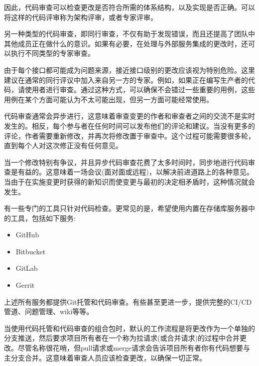 因此，代码审查可以检查更改是否符合所需的体系结构，以及实现是否正确。可以将这样的代码评审称为架构评审，或者专家评审。

另一种类型的代码审查，即同行审查，不仅有助于发现错误，而且还提高了团队中其他成员正在做什么的意识。如果有必要，在处理与外部服务集成的更改时，还可以执行不同类型的专家审查。

由于每个接口都可能成为问题来源，接近接口级别的更改应该视为特别危险。这里建议在通常的同行评议中加入来自另一方的专家。例如，如果正在编写生产者的代码，请使用者进行审查。通过这种方式，可以确保不会错过一些重要的用例，这些用例在某个方面可能认为不太可能出现，但另一方面可能经常使用。


代码审查通常会异步进行，这意味着审查变更的作者和审查者之间的交流不是实时发生的。相反，每个参与者在任何时间可以发布他们的评论和建议。当没有更多的评论，作者需要重新修改，并再次将修改置于审查中。这个过程可能需要很多轮，直到每个人对这次修正没有任何意见。

当一个修改特别有争议，并且异步代码审查花费了太多时间时，同步地进行代码审查是有益的。这意味着一场会议(面对面或远程)，以解决前进道路上的各种意见。当由于在实施变更时获得的新知识而使变更与最初的决定相矛盾时，这种情况就会发生。

有一些专门的工具只针对代码检查。更常见的是，希望使用内置在存储库服务器中的工具，包括如下服务:

\begin{itemize}
\item 
GitHub

\item 
Bitbucket

\item 
GitLab

\item 
Gerrit
\end{itemize}

上述所有服务都提供Git托管和代码审查。有些甚至更进一步，提供完整的CI/CD管道、问题管理、wiki等等。

当使用代码托管和代码审查的组合包时，默认的工作流程是将更改作为一个单独的分支推送，然后要求项目所有者在一个称为拉请求(或合并请求)的过程中合并更改。尽管名称很花哨，但pull请求或merge请求会告诉项目所有者你有代码想要与主分支合并。这意味着审查人员应该检查更改，以确保一切正常。



